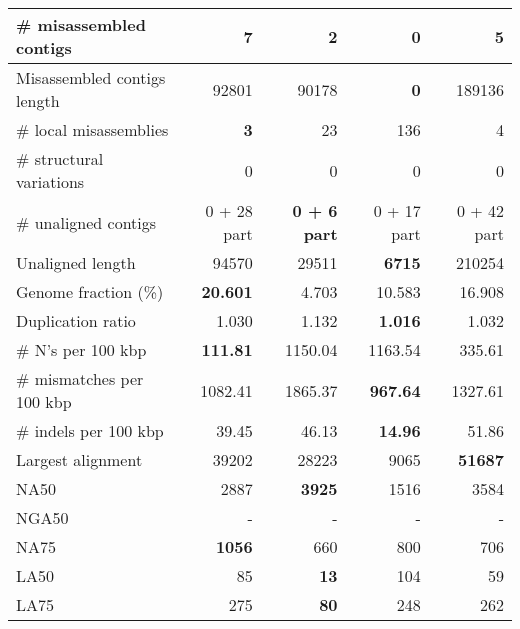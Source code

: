 \documentclass[12pt,a4paper]{article}
\begin{document}
\begin{table}[ht]
\begin{center}
\begin{tabular}{|l*{4}{|r}|}
\# misassembled contigs & 7 & 2 & {\bf 0} & 5 \\ \hline
Misassembled contigs length & 92801 & 90178 & {\bf 0} & 189136 \\ \hline
\# local misassemblies & {\bf 3} & 23 & 136 & 4 \\ \hline
\# structural variations & 0 & 0 & 0 & 0 \\ \hline
\# unaligned contigs & 0 + 28 part & {\bf 0 + 6 part} & 0 + 17 part & 0 + 42 part \\ \hline
Unaligned length & 94570 & 29511 & {\bf 6715} & 210254 \\ \hline
Genome fraction (\%) & {\bf 20.601} & 4.703 & 10.583 & 16.908 \\ \hline
Duplication ratio & 1.030 & 1.132 & {\bf 1.016} & 1.032 \\ \hline
\# N's per 100 kbp & {\bf 111.81} & 1150.04 & 1163.54 & 335.61 \\ \hline
\# mismatches per 100 kbp & 1082.41 & 1865.37 & {\bf 967.64} & 1327.61 \\ \hline
\# indels per 100 kbp & 39.45 & 46.13 & {\bf 14.96} & 51.86 \\ \hline
Largest alignment & 39202 & 28223 & 9065 & {\bf 51687} \\ \hline
NA50 & 2887 & {\bf 3925} & 1516 & 3584 \\ \hline
NGA50 & - & - & - & - \\ \hline
NA75 & {\bf 1056} & 660 & 800 & 706 \\ \hline
LA50 & 85 & {\bf 13} & 104 & 59 \\ \hline
LA75 & 275 & {\bf 80} & 248 & 262 \\ \hline
\end{tabular}
\end{center}
\end{table}
\end{document}
